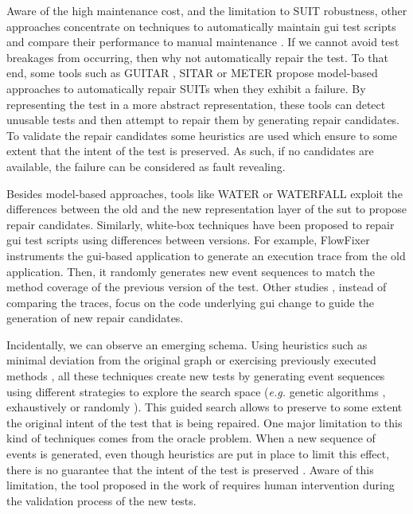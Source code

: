 Aware of the high maintenance cost, and the limitation to SUIT robustness, other approaches concentrate on techniques to automatically maintain \gls{gui} test scripts and compare their performance to manual maintenance \cite{Grechanik2009, Grechanik2009b}. If we cannot avoid test breakages from occurring, then why not automatically repair the test. To that end, some tools such as GUITAR \cite{Memon2008}, SITAR \cite{Gao2016} or METER \cite{Pan2020} propose model-based approaches to automatically repair SUITs when they exhibit a failure. By representing the test in a more abstract representation, these tools can detect unusable tests and then attempt to repair them by generating repair candidates. To validate the repair candidates some heuristics are used which ensure to some extent that the intent of the test is preserved. As such, if no candidates are available, the failure can be considered as fault revealing.

Besides model-based approaches, tools like WATER \cite{Choudhary2011} or WATERFALL \cite{Hammoudi2016b} exploit the differences between the old and the new representation layer of the \gls{sut} to propose repair candidates. Similarly, white-box techniques have been proposed to repair \gls{gui} test scripts using differences between versions. For example, FlowFixer \cite{Zhang2013} instruments the \gls{gui}-based application to generate an execution trace from the old application. Then, it randomly generates new event sequences to match the method coverage of the previous version of the test. Other studies \cite{Grechanik2009, Fu2009}, instead of comparing the traces, focus on the code underlying \gls{gui} change to guide the generation of new repair candidates.

Incidentally, we can observe an emerging schema. Using heuristics such as minimal deviation from the original graph\cite{Memon2008} or exercising previously executed methods \cite{Zhang2013}, all these techniques create new tests by generating event sequences using different strategies  to explore the search space (\emph{e.g.} genetic algorithms \cite{Huang2010}, exhaustively \cite{Memon2008} or randomly \cite{Zhang2013}). This guided search allows to preserve to some extent the original intent of the test that is being repaired. One major limitation to this kind of techniques comes from the oracle problem. When a new sequence of events is generated, even though heuristics are put in place to limit this effect, there is no guarantee that the intent of the test is preserved \cite{Li2019}. Aware of this limitation, the tool proposed in the work of \textcite{Gao2016} requires human intervention during the validation process of the new tests.

